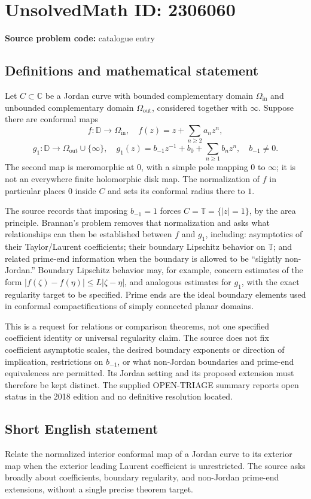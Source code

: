 \documentclass[11pt]{article}
\newcommand{\C}{\mathbb{C}}
\begin{document}
\section*{UnsolvedMath ID: 2306060}
\textbf{Source problem code:} catalogue entry
\subsection{Definitions and mathematical statement}
Let \(C\subset\C\) be a Jordan curve with bounded complementary domain \(\Omega_{\mathrm{in}}\) and unbounded complementary domain \(\Omega_{\mathrm{out}}\), considered together with \(\infty\). Suppose there are conformal maps
\[
f:\mathbb D\to\Omega_{\mathrm{in}},\quad
f(z)=z+\sum_{n\ge2}a_nz^n,
\]
\[
g_1:\mathbb D\to\Omega_{\mathrm{out}}\cup\{\infty\},\quad
g_1(z)=b_{-1}z^{-1}+b_0+\sum_{n\ge1}b_nz^n,\quad b_{-1}\ne0.
\]
The second map is meromorphic at \(0\), with a simple pole mapping \(0\) to \(\infty\); it is not an everywhere finite holomorphic disk map. The normalization of \(f\) in particular places \(0\) inside \(C\) and sets its conformal radius there to \(1\).

The source records that imposing \(b_{-1}=1\) forces \(C=\mathbb T=\{|z|=1\}\), by the area principle. Brannan's problem removes that normalization and asks what relationships can then be established between \(f\) and \(g_1\), including: asymptotics of their Taylor/Laurent coefficients; their boundary Lipschitz behavior on \(\mathbb T\); and related prime-end information when the boundary is allowed to be ``slightly non-Jordan.'' Boundary Lipschitz behavior may, for example, concern estimates of the form \(|f(\zeta)-f(\eta)|\le L|\zeta-\eta|\), and analogous estimates for \(g_1\), with the exact regularity target to be specified. Prime ends are the ideal boundary elements used in conformal compactifications of simply connected planar domains.

This is a request for relations or comparison theorems, not one specified coefficient identity or universal regularity claim. The source does not fix coefficient asymptotic scales, the desired boundary exponents or direction of implication, restrictions on \(b_{-1}\), or what non-Jordan boundaries and prime-end equivalences are permitted. Its Jordan setting and its proposed extension must therefore be kept distinct. The supplied OPEN-TRIAGE summary reports open status in the 2018 edition and no definitive resolution located.
\subsection{Short English statement}
Relate the normalized interior conformal map of a Jordan curve to its exterior map when the exterior leading Laurent coefficient is unrestricted. The source asks broadly about coefficients, boundary regularity, and non-Jordan prime-end extensions, without a single precise theorem target.
\end{document}
